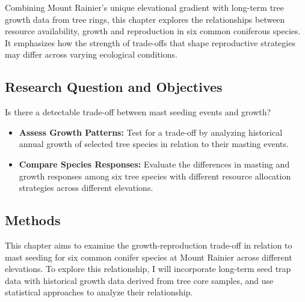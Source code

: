 \documentclass[11pt,letter]{article}
\begin{document}
Combining Mount Rainier's unique elevational gradient with long-term tree growth data from tree rings, this chapter explores the relationships between resource availability, growth and reproduction in six common coniferous species. It emphasizes how the strength of trade-offs that shape reproductive strategies may differ across varying ecological conditions.
\subsection{Research Question and Objectives}
Is there a detectable trade-off between mast seeding events and growth?
	\begin{itemize}
	\item \textbf{Assess Growth Patterns:} Test for a trade-off by analyzing historical annual growth of selected tree species in relation to their masting events.
	\item \textbf{Compare Species Responses:} Evaluate the differences in masting and growth responses among six tree species with different resource allocation strategies across different elevations.
	\end{itemize}
\subsection{Methods}
This chapter aims to examine the growth-reproduction trade-off in relation to mast seeding for six common conifer species at Mount Rainier across different elevations. To explore this relationship, I will incorporate long-term seed trap data with historical growth data derived from tree core samples, and use statistical approaches to analyze their relationship.\par
\end{document}
